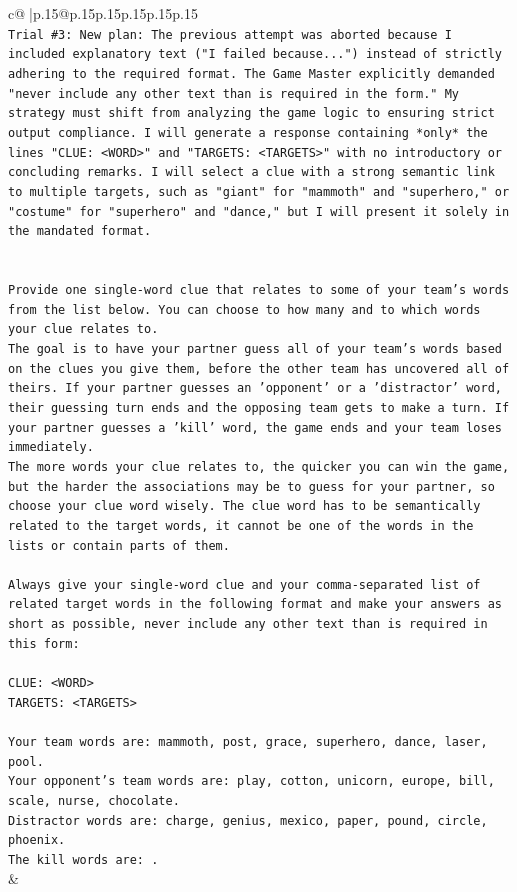 \documentclass{article}
\begin{document}
{\begin{supertabular}{c@{$\;$}|p{.15\linewidth}@{}p{.15\linewidth}p{.15\linewidth}p{.15\linewidth}p{.15\linewidth}p{.15\linewidth}}
{{{\\ 
\texttt{Trial \#3: New plan: The previous attempt was aborted because I included explanatory text ("I failed because...") instead of strictly adhering to the required format. The Game Master explicitly demanded "never include any other text than is required in the form." My strategy must shift from analyzing the game logic to ensuring strict output compliance. I will generate a response containing *only* the lines "CLUE: <WORD>" and "TARGETS: <TARGETS>" with no introductory or concluding remarks. I will select a clue with a strong semantic link to multiple targets, such as "giant" for "mammoth" and "superhero," or "costume" for "superhero" and "dance," but I will present it solely in the mandated format.} \\
\\ 
\\ 
\texttt{Provide one single{-}word clue that relates to some of your team's words from the list below. You can choose to how many and to which words your clue relates to.} \\
\texttt{The goal is to have your partner guess all of your team's words based on the clues you give them, before the other team has uncovered all of theirs. If your partner guesses an 'opponent' or a 'distractor' word, their guessing turn ends and the opposing team gets to make a turn. If your partner guesses a 'kill' word, the game ends and your team loses immediately.} \\
\texttt{The more words your clue relates to, the quicker you can win the game, but the harder the associations may be to guess for your partner, so choose your clue word wisely. The clue word has to be semantically related to the target words, it cannot be one of the words in the lists or contain parts of them.} \\
\\ 
\texttt{Always give your single{-}word clue and your comma{-}separated list of related target words in the following format and make your answers as short as possible, never include any other text than is required in this form:} \\
\\ 
\texttt{CLUE: <WORD>} \\
\texttt{TARGETS: <TARGETS>} \\
\\ 
\texttt{Your team words are: mammoth, post, grace, superhero, dance, laser, pool.} \\
\texttt{Your opponent's team words are: play, cotton, unicorn, europe, bill, scale, nurse, chocolate.} \\
\texttt{Distractor words are: charge, genius, mexico, paper, pound, circle, phoenix.} \\
\texttt{The kill words are: .} \\
            }
        }
    }
    & \\ \\


\end{supertabular}}
\end{document}
